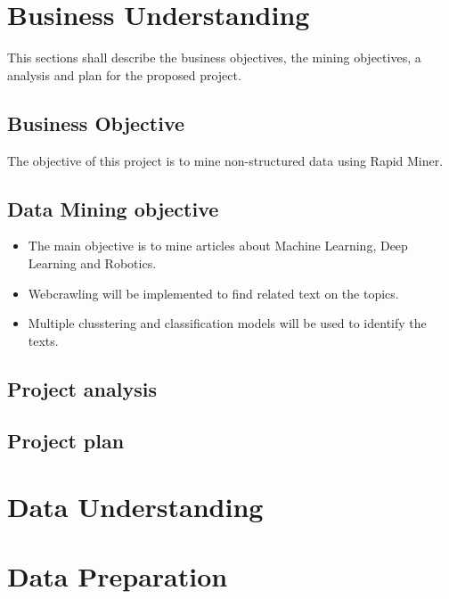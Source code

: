 
\section*{Business Understanding}
This sections shall describe the business objectives, the mining objectives, a analysis and plan for the proposed project.

\subsection*{Business Objective}
The objective of this project is to mine non-structured data using Rapid Miner.

\subsection*{Data Mining objective}
\begin{itemize}
	\item The main objective is to mine articles about Machine Learning, Deep Learning and Robotics. 
	\item Webcrawling will be implemented to find related text on the topics.
	\item Multiple clusstering and classification models will be used to identify the texts.
\end{itemize}

\subsection*{Project analysis}

\subsection*{Project plan}



\section*{Data Understanding}


\section*{Data Preparation}


